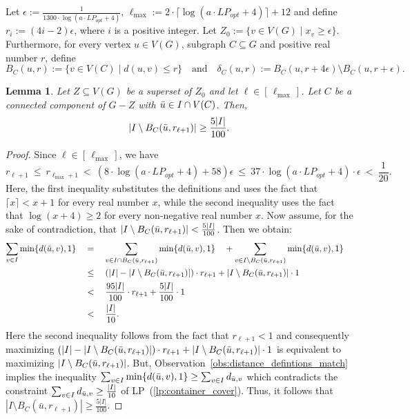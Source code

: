 \documentclass[11pt]{amsart}
\newtheorem{lemma}[theorem]{Lemma}
\newcommand{\lpopt}{LP_{opt}}
\begin{document}
Let $\epsilon := \frac{1}{1300 \cdot \log(a \cdot \lpopt + 4) }$, 
$\ell_{\max} := 2 \cdot  \lceil \log(a \cdot \lpopt + 4) \rceil + 12$ and define $r_{i} := (4i - 2)\epsilon$, where $i$ is a positive integer. Let $Z_0 := \{v \in V(G) \mid x_v \geq \epsilon\}$. Furthermore, for every vertex $u \in V(G)$, subgraph $C\subseteq G$ and positive real number $r$, define 
$$
B_C(u, r) := \{v \in V(C) \mid d(u, v) \leq r\}
\quad \text{and} \quad
\delta_C(u, r) := B_C(u, r + 4\epsilon) \setminus B_C(u, r + \epsilon).
$$

\begin{lemma}\label{lem:good_layer_many_outside}
    Let $Z \subseteq V(G)$ be a superset of $Z_0$ and let $\ell \in [\,\ell_{\max}\,]$. Let $C$ be a connected component of $G - Z$ with $\Bar{u} \in I \cap V(C)$. Then,
    $$
    \left| I \setminus B_C(\Bar{u}, r_{\ell+1}) \right| \geq \frac{5|I|}{100}.
    $$
\end{lemma}
\begin{proof}
    Since $\ell \in [\,\ell_{\max}\,]$, we have 
    $$
    r_{\ell+1} \
    \leq \ r_{\ell_{\max} + 1} \
    < \ (8\cdot \log(a \cdot \lpopt + 4) + 58)\epsilon \
    \leq \ 37\cdot \log(a \cdot \lpopt + 4)\cdot \epsilon \
    < \ \frac{1}{20}.
    $$
    Here, the first inequality substitutes the definitions and uses the fact that $\lceil x\rceil < x+1$ for every real number $x$, while the second inequality uses the fact that $\log(x + 4) \geq 2$ for every non-negative real number $x$.
    Now assume, for the sake of contradiction, that $\left| I \setminus B_C(\Bar{u}, r_{\ell+1}) \right| < \frac{5|I|}{100}$.
    Then we obtain:
    $$
    \begin{aligned}
    \sum_{v \in I} \min\{d(\Bar{u}, v),1\} \quad
    &= \quad \sum_{v \in I \cap B_C(\Bar{u}, r_{\ell+1})} \min\{d(\Bar{u}, v),1\} 
       \quad + \sum_{v \in I \setminus B_C(\Bar{u}, r_{\ell+1})} \min\{d(\Bar{u}, v),1\} \quad \\
    &\leq \quad\left(|I| - |I\setminus B_C(\Bar{u}, r_{\ell+1})|\right)\cdot r_{\ell+1} + |I\setminus B_C(\Bar{u}, r_{\ell+1})|\cdot 1 \\
    &< \quad \frac{95|I|}{100} \cdot r_{\ell+1} + \frac{5|I|}{100} \cdot 1 \quad \\
    &< \quad \frac{|I|}{10}.
    \end{aligned}
    $$
    Here the second inequality follows from the fact that $r_{\ell+1} < 1$ and consequently maximizing $\left(|I| - |I\setminus B_C(\Bar{u}, r_{\ell+1})|\right)\cdot r_{\ell+1} + |I\setminus B_C(\Bar{u}, r_{\ell+1})|\cdot 1$ is equivalent to maximizing $|I\setminus B_C(\Bar{u}, r_{\ell+1})|$.
    But, Observation~\ref{obs:distance_defintions_match} implies the inequality $\sum_{v \in I} \min\{d(\Bar{u},v),1\} \geq \sum_{v \in I} d_{\Bar{u},v}$ which contradicts the constraint $\sum_{v \in I} d_{\Bar{u}, v} \geq \frac{|I|}{10}$ of LP~(\ref{lp:container_cover}). Thus, it follows that $|I \setminus B_C(\bar{u}, r_{\ell+1})| \geq \frac{5|I|}{100}$.
\end{proof}
\end{document}
